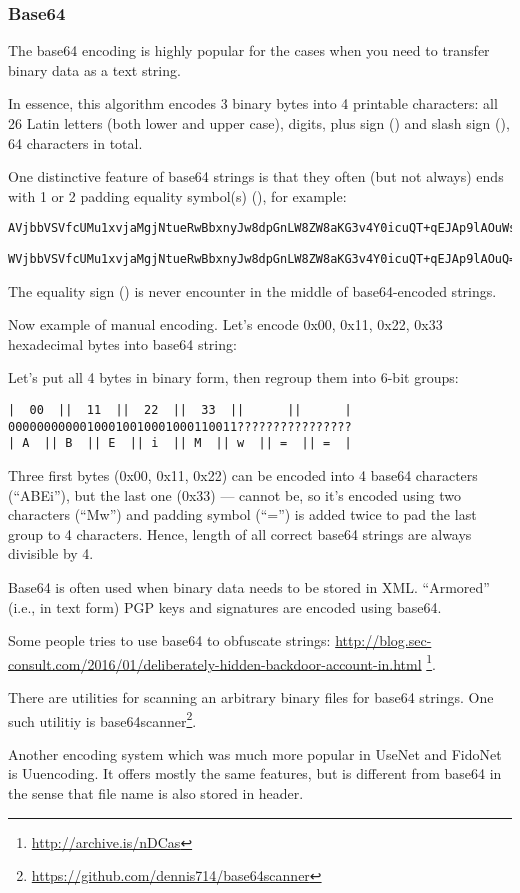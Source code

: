 \subsubsection{Base64}

The base64 encoding is highly popular for the cases when you need to transfer binary data as a text string.

In essence, this algorithm encodes 3 binary bytes into 4 printable characters:
all 26 Latin letters (both lower and upper case), digits, plus sign (\q{+}) and slash sign (\q{/}),
64 characters in total.

One distinctive feature of base64 strings is that they often (but not always) ends with 1 or 2 \gls{padding}
equality symbol(s) (\q{=}), for example:

\begin{lstlisting}
AVjbbVSVfcUMu1xvjaMgjNtueRwBbxnyJw8dpGnLW8ZW8aKG3v4Y0icuQT+qEJAp9lAOuWs=
\end{lstlisting}

\begin{lstlisting}
WVjbbVSVfcUMu1xvjaMgjNtueRwBbxnyJw8dpGnLW8ZW8aKG3v4Y0icuQT+qEJAp9lAOuQ==
\end{lstlisting}

The equality sign (\q{=}) is never encounter in the middle of base64-encoded strings.

Now example of manual encoding.
Let's encode 0x00, 0x11, 0x22, 0x33 hexadecimal bytes into base64 string:



Let's put all 4 bytes in binary form, then regroup them into 6-bit groups:

\begin{lstlisting}
|  00  ||  11  ||  22  ||  33  ||      ||      |
00000000000100010010001000110011????????????????
| A  || B  || E  || i  || M  || w  || =  || =  |
\end{lstlisting}

Three first bytes (0x00, 0x11, 0x22) can be encoded into 4 base64 characters (``ABEi''),
but the last one (0x33) --- cannot be,
so it's encoded using two characters (``Mw'') and \gls{padding} symbol (``='')
is added twice to pad the last group to 4 characters.
Hence, length of all correct base64 strings are always divisible by 4.

Base64 is often used when binary data needs to be stored in XML.
``Armored'' (i.e., in text form) PGP keys and signatures are encoded using base64.

Some people tries to use base64 to obfuscate strings:
\url{http://blog.sec-consult.com/2016/01/deliberately-hidden-backdoor-account-in.html}
\footnote{\url{http://archive.is/nDCas}}.

There are utilities for scanning an arbitrary binary files for base64 strings.
One such utilitiy is base64scanner\footnote{\url{https://github.com/dennis714/base64scanner}}.

Another encoding system which was much more popular in UseNet and FidoNet is Uuencoding.
It offers mostly the same features, but is different from base64 in the sense that file name
is also stored in header.
